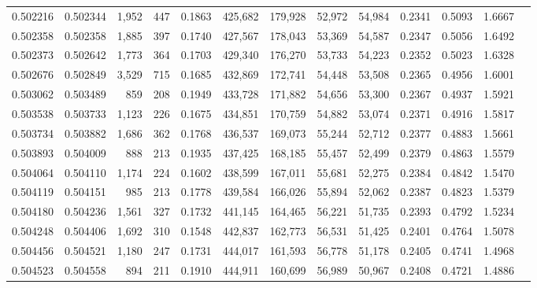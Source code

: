 \begin{tabular}{rrrrrrrrrrrrr}
0.502216 & 0.502344 &  1,952 &   447 &                                     0.1863 & 425,682 & 179,928 &  52,972 &  54,984 & 0.2341 & 0.5093 & 1.6667 \\
0.502358 & 0.502358 &  1,885 &   397 &                                     0.1740 & 427,567 & 178,043 &  53,369 &  54,587 & 0.2347 & 0.5056 & 1.6492 \\
0.502373 & 0.502642 &  1,773 &   364 &                                     0.1703 & 429,340 & 176,270 &  53,733 &  54,223 & 0.2352 & 0.5023 & 1.6328 \\
0.502676 & 0.502849 &  3,529 &   715 &                                     0.1685 & 432,869 & 172,741 &  54,448 &  53,508 & 0.2365 & 0.4956 & 1.6001 \\
0.503062 & 0.503489 &    859 &   208 &                                     0.1949 & 433,728 & 171,882 &  54,656 &  53,300 & 0.2367 & 0.4937 & 1.5921 \\
0.503538 & 0.503733 &  1,123 &   226 &                                     0.1675 & 434,851 & 170,759 &  54,882 &  53,074 & 0.2371 & 0.4916 & 1.5817 \\
0.503734 & 0.503882 &  1,686 &   362 &                                     0.1768 & 436,537 & 169,073 &  55,244 &  52,712 & 0.2377 & 0.4883 & 1.5661 \\
0.503893 & 0.504009 &    888 &   213 &                                     0.1935 & 437,425 & 168,185 &  55,457 &  52,499 & 0.2379 & 0.4863 & 1.5579 \\
0.504064 & 0.504110 &  1,174 &   224 &                                     0.1602 & 438,599 & 167,011 &  55,681 &  52,275 & 0.2384 & 0.4842 & 1.5470 \\
0.504119 & 0.504151 &    985 &   213 &                                     0.1778 & 439,584 & 166,026 &  55,894 &  52,062 & 0.2387 & 0.4823 & 1.5379 \\
0.504180 & 0.504236 &  1,561 &   327 &                                     0.1732 & 441,145 & 164,465 &  56,221 &  51,735 & 0.2393 & 0.4792 & 1.5234 \\
0.504248 & 0.504406 &  1,692 &   310 &                                     0.1548 & 442,837 & 162,773 &  56,531 &  51,425 & 0.2401 & 0.4764 & 1.5078 \\
0.504456 & 0.504521 &  1,180 &   247 &                                     0.1731 & 444,017 & 161,593 &  56,778 &  51,178 & 0.2405 & 0.4741 & 1.4968 \\
0.504523 & 0.504558 &    894 &   211 &                                     0.1910 & 444,911 & 160,699 &  56,989 &  50,967 & 0.2408 & 0.4721 & 1.4886 \\

\end{tabular}
